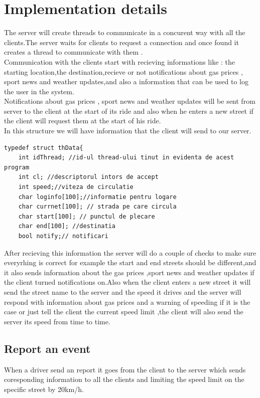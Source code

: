 \documentclass{article}
\begin{document}
\section{\textbf{Implementation details}}
The server will create threads to communicate in a concurent way with all the clients.The server waits for clients to request a connection and once found it creates a thread to communicate with them .\\
Communication with the clients start with recieving informations like : the starting location,the destination,recieve or not notifications about gas prices , sport news and weather updates,and also a information that can be used to log the user in the system.\\
Notifications about gas prices , sport news and weather updates will be sent from server to the client at the start of its ride and also when he enters a new street if the client will request them at the start of his ride.\\
In this structure we will have information that the client will send to our server.\\
\begin{verbatim}
typedef struct thData{
	int idThread; //id-ul thread-ului tinut in evidenta de acest program
	int cl; //descriptorul intors de accept
	int speed;//viteza de circulatie
	char loginfo[100];//informatie pentru logare
	char currnet[100]; // strada pe care circula 
	char start[100]; // punctul de plecare
	char end[100]; //destinatia
	bool notify;// notificari
\end{verbatim} 

After recieving this information the server will do a couple of checks to make sure everyrhing is correct for example the start and end streets should be different,and it also sends information about the gas prices ,sport news and weather updates if the client turned notifications on.Also when the client enters a new street it will send the street name to the server and the speed it drives and the server will respond with information about gas prices and a warning of speeding if it is the case or just tell the client the current speed limit ,the client will also send the server its speed from time to time. \\
\subsection{Report an event}
When a driver send an report it goes from the client to the server which sends coresponding information to all the clients and limiting the speed limit on the specific street by 20km/h.
\end{document}
